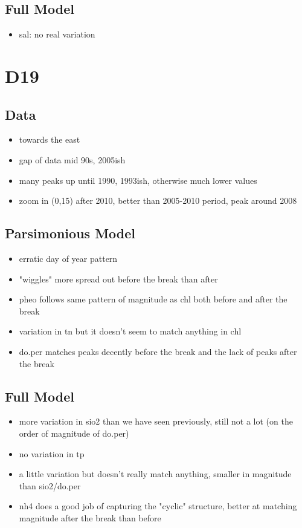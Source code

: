\documentclass[12pt]{amsart}
\begin{document}
\subsection{Full Model}
\begin{itemize}
\item sal: no real variation
\end{itemize}
\section{D19}
\subsection{Data}
\begin{itemize}
\item towards the east
\item gap of data mid 90s, 2005ish
\item many peaks up until 1990, 1993ish, otherwise much lower values
\item zoom in (0,15) after 2010, better than 2005-2010 period, peak around 2008
\end{itemize}
\subsection{Parsimonious Model}
\begin{itemize}
\item erratic day of year pattern
\item "wiggles" more spread out before the break than after
\item pheo follows same pattern of magnitude as chl both before and after the break
\item variation in tn but it doesn't seem to match anything in chl
\item do.per matches peaks decently before the break and the lack of peaks after the break
\end{itemize}
\subsection{Full Model}
\begin{itemize}
\item more variation in sio2 than we have seen previously, still not a lot (on the order of magnitude of do.per)
\item no variation in tp
\item a little variation but doesn't really match anything, smaller in magnitude than sio2/do.per
\item nh4 does a good job of capturing the "cyclic" structure, better at matching magnitude after the break than before
\end{itemize}
\end{document}
